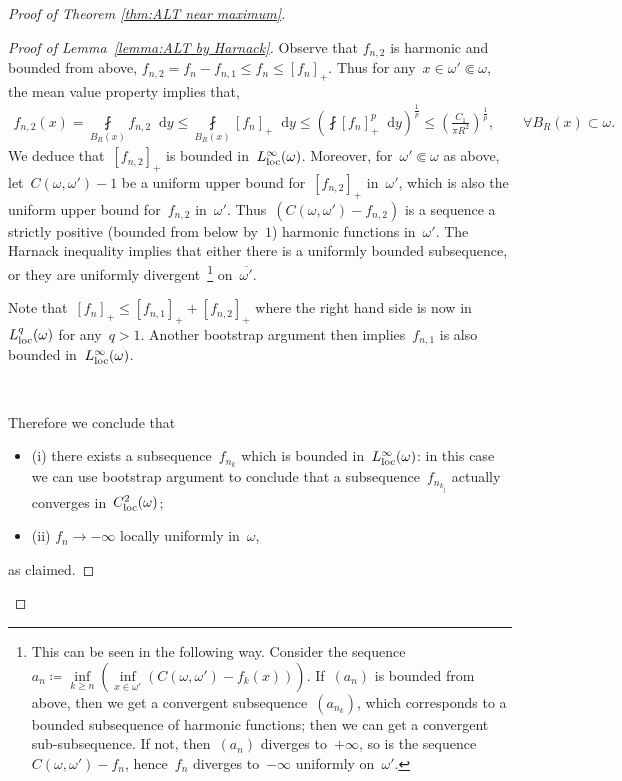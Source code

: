 \documentclass[10pt]{amsart}
\newcommand{\parenthesis}[1]{\left(#1\right)} %
\newcommand{\dd}{\mathop{}\!\mathrm{d}}
\renewcommand{\to}{\rightarrow}
\begin{document}
\begin{proof}[Proof of Theorem \ref{thm:ALT near maximum}]
\begin{proof}[Proof of Lemma~\ref{lemma:ALT by Harnack}]
        Observe that $f_{n,2}$ is harmonic and bounded from above, $f_{n,2}=f_n- f_{n,1}\leq f_n \leq [f_n]_+$.
        Thus for any~$x\in \omega'\Subset \omega$, the mean value property implies that,
        \begin{align*}
            f_{n,2}(x)=\fint\limits_{B_R(x)} f_{n,2}\dd{y}
            \leq\fint\limits_{B_R(x)} [f_n]_+\dd{y}
            \leq \parenthesis{\fint\limits [f_n]_+^p\dd{y}}^{\frac{1}{p}}
            \leq \parenthesis{\frac{C_1}{\pi R^2}}^{\frac{1}{p}},
            \qquad \forall B_R(x)\subset \omega.
        \end{align*}
        We deduce that~$[f_{n,2}]_+$ is bounded in~$L^\infty_{\rm loc}(\omega)$.
        Moreover, for~$\omega'\Subset \omega$ as above, let~$C(\omega,\omega')-1$ be a uniform upper bound for~$[f_{n,2}]_+$ in~$\omega'$, which is also the uniform upper bound for~$f_{n,2}$ in~$\omega'$.
        Thus~$(C(\omega,\omega')-f_{n,2})$ is a sequence a strictly positive  (bounded from below by~$1$) harmonic functions in~$\omega'$.
        The Harnack inequality implies that either there is a uniformly bounded subsequence,
        or they are uniformly divergent~\footnote{This can be seen in the following way. Consider
        the sequence~$a_n\coloneqq \inf\limits_{k\geq n} \parenthesis{\inf\limits_{x\in \omega'}
        (C(\omega,\omega')-f_k(x))}$. If~$(a_n)$ is bounded from above, then we get a convergent subsequence~$(a_{n_k})$,
        which corresponds to a bounded subsequence of harmonic functions;
        then we can get a convergent sub-subsequence. If not, then~$(a_n)$ diverges to~$+\infty$,
        so is the sequence~$C(\omega,\omega')-f_n$, hence~$f_{n}$ diverges to~$-\infty$ uniformly on~$\omega'$.} on~$\overline{\omega'}$.

        Note that~$[f_n]_+ \leq [f_{n,1}]_+ + [f_{n,2}]_+$ where the right hand side is now in~$L^q_{\rm loc}(\omega)$ for any~$q>1$. Another bootstrap argument then implies~$f_{n,1}$ is also bounded in~$L^\infty_{\rm loc}(\omega)$.

        \

        Therefore we conclude that
        \begin{itemize}
            \item[either] {\rm (i)} there exists a subsequence~$f_{n_k}$ which is bounded in~$L^\infty_{\rm loc}(\omega)$: in this case we can use bootstrap argument to conclude that a subsequence~$f_{n_{k_j}}$ actually converges in~$C^2_{\rm loc}(\omega)$;
            \item[or $\quad$] {\rm (ii)} $f_{n}\to-\infty$ locally uniformly in~$\omega$,
        \end{itemize}
as claimed.
    \end{proof}


\end{proof}
\end{document}
